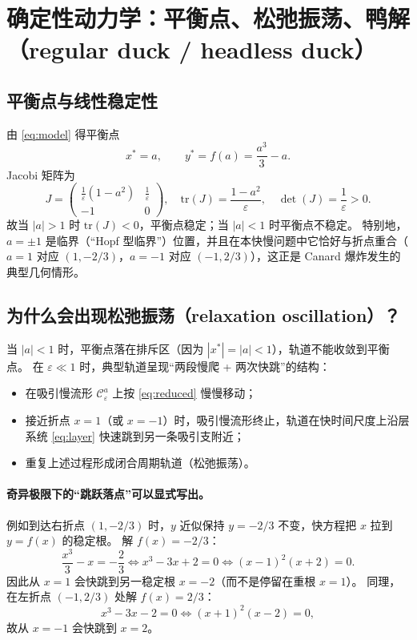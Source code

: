 	\section{确定性动力学：平衡点、松弛振荡、鸭解（regular duck / headless duck）}
	
	\subsection{平衡点与线性稳定性}
	由 \eqref{eq:model} 得平衡点
	\[
	x^\ast=a,\qquad y^\ast=f(a)=\frac{a^3}{3}-a.
	\]
	Jacobi 矩阵为
	\[
	J=
	\begin{pmatrix}
		\frac{1}{\varepsilon}(1-a^2) & \frac{1}{\varepsilon}\\[3pt]
		-1 & 0
	\end{pmatrix},
	\quad
	\mathrm{tr}(J)=\frac{1-a^2}{\varepsilon},\quad
	\det(J)=\frac{1}{\varepsilon}>0.
	\]
	故当 $|a|>1$ 时 $\mathrm{tr}(J)<0$，平衡点稳定；当 $|a|<1$ 时平衡点不稳定。
	特别地，$a=\pm1$ 是临界（“Hopf 型临界”）位置，并且在本快慢问题中它恰好与折点重合（$a=1$ 对应 $(1,-2/3)$，$a=-1$ 对应 $(-1,2/3)$），这正是 Canard 爆炸发生的典型几何情形。
	
	\subsection{为什么会出现松弛振荡（relaxation oscillation）？}
	当 $|a|<1$ 时，平衡点落在排斥区（因为 $|x^\ast|=|a|<1$），轨道不能收敛到平衡点。
	在 $\varepsilon\ll1$ 时，典型轨道呈现“两段慢爬 + 两次快跳”的结构：
	
	\begin{itemize}
		\item 在吸引慢流形 $\mathcal C_\varepsilon^{a}$ 上按 \eqref{eq:reduced} 慢慢移动；
		\item 接近折点 $x=1$（或 $x=-1$）时，吸引慢流形终止，轨道在快时间尺度上沿层系统 \eqref{eq:layer} 快速跳到另一条吸引支附近；
		\item 重复上述过程形成闭合周期轨道（松弛振荡）。
	\end{itemize}
	
	\paragraph{奇异极限下的“跳跃落点”可以显式写出。}
	例如到达右折点 $(1,-2/3)$ 时，$y$ 近似保持 $y=-2/3$ 不变，快方程把 $x$ 拉到 $y=f(x)$ 的稳定根。
	解 $f(x)=-2/3$：
	\[
	\frac{x^3}{3}-x=-\frac{2}{3}
	\iff x^3-3x+2=0
	\iff (x-1)^2(x+2)=0.
	\]
	因此从 $x=1$ 会快跳到另一稳定根 $x=-2$（而不是停留在重根 $x=1$）。
	同理，在左折点 $(-1,2/3)$ 处解 $f(x)=2/3$：
	\[
	x^3-3x-2=0 \iff (x+1)^2(x-2)=0,
	\]
	故从 $x=-1$ 会快跳到 $x=2$。
	
